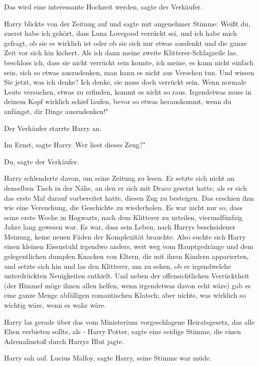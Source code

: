 \glqq{}Das wird eine interessante Hochzeit werden\grqq{}, sagte der Verkäufer.

Harry blickte von der Zeitung auf und sagte mit angenehmer Stimme: \glqq{}Weißt
du, zuerst habe ich gehört, dass Luna Lovegood verrückt sei, und ich habe mich
gefragt, ob sie es wirklich ist oder ob sie sich nur etwas ausdenkt und die
ganze Zeit vor sich hin kichert. Als ich dann meine zweite Klitterer-Schlagzeile
las, beschloss ich, dass sie nicht verrückt sein konnte, ich meine, es kann
nicht einfach sein, sich so etwas auszudenken, man kann es nicht aus Versehen
tun. Und wissen Sie jetzt, was ich denke? Ich denke, sie muss doch verrückt
sein. Wenn normale Leute versuchen, etwas zu erfinden, kommt es nicht so raus.
Irgendetwas muss in deinem Kopf wirklich schief laufen, bevor so etwas
herauskommt, wenn du anfängst, dir Dinge auszudenken!"

Der Verkäufer starrte Harry an.

\glqq{}Im Ernst\grqq{}, sagte Harry. \glqq{}Wer liest dieses Zeug?"

\glqq{}Du\grqq{}, sagte der Verkäufer.

Harry schlenderte davon, um seine Zeitung zu lesen. Er setzte sich nicht an
denselben Tisch in der Nähe, an den er sich mit Draco gesetzt hatte, als er sich
das erste Mal darauf vorbereitet hatte, diesen Zug zu besteigen. Das erschien
ihm wie eine Versuchung, die Geschichte zu wiederholen. Es war nicht nur so,
dass seine erste Woche in Hogwarts, nach dem Klitterer zu urteilen,
vierundfünfzig Jahre lang gewesen war. Es war, dass sein Leben, nach Harrys
bescheidener Meinung, keine neuen Fäden der Komplexität brauchte. Also suchte
sich Harry einen kleinen Eisenstuhl irgendwo anders, weit weg vom Hauptgedränge
und dem gelegentlichen dumpfen Knacken von Eltern, die mit ihren Kindern
apparierten, und setzte sich hin und las den Klitterer, um zu sehen, ob er
irgendwelche unterdrückten Neuigkeiten enthielt. Und neben der offensichtlichen
Verrücktheit (der Himmel möge ihnen allen helfen, wenn irgendetwas davon echt
wäre) gab es eine ganze Menge abfälligen romantischen Klatsch; aber nichts, was
wirklich so wichtig wäre, wenn es wahr wäre.

Harry las gerade über das vom Ministerium vorgeschlagene Heiratsgesetz, das alle
Ehen verbieten sollte, als - \glqq{}Harry Potter\grqq{}, sagte eine seidige
Stimme, die einen Adrenalinstoß durch Harrys Blut jagte.

Harry sah auf. \glqq{}Lucius Malfoy\grqq{}, sagte Harry, seine Stimme war müde.

